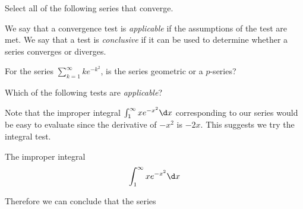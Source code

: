 \documentclass{ximera}
\author{Jim Talamo}
\begin{document}
\begin{exercise}

Select all of the following series that converge.

\begin{selectAll}
\end{selectAll}

\begin{hint}
We say that a convergence test is \emph{applicable} if the assumptions of the test are met.  We say that a test is \emph{conclusive} if it can be used to determine whether a series converges or diverges.

\begin{question}
For the series $\sum_{k=1}^{\infty}ke^{-k^2}$, is the series geometric or a $p$-series?

\begin{multipleChoice}
\end{multipleChoice}

 Which of the following tests are \emph{applicable}?

\begin{selectAll}
\end{selectAll}


Note that the improper integral $\int_{1}^{\infty} xe^{-x^2} \d x$ corresponding to our series would be easy to evaluate since the derivative of $-x^2$ is $-2x$. This suggests we try the integral test. 

The improper integral 
\[
\int_{1}^{\infty} xe^{-x^2} \d x
\]

\begin{multipleChoice}
\end{multipleChoice}

Therefore we can conclude that the series 


\end{question}
\end{hint}
\end{exercise}
\end{document}
